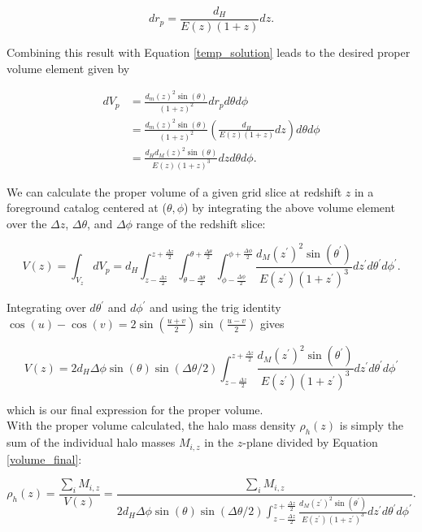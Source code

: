 \documentclass[12pt]{article}
\begin{document}
\begin{equation}\label{physical2comoving_inf}
dr_p=\frac{d_H}{E(z)(1+z)}dz.
\end{equation}

Combining this result with Equation \eqref{temp_solution} leads to the desired proper volume element given by

\begin{align}
dV_p&=\frac{d_m(z)^2\sin(\theta)}{(1+z)^2}dr_pd\theta d\phi\nonumber\\
&=\frac{d_m(z)^2\sin(\theta)}{(1+z)^2}\left(\frac{d_H}{E(z)(1+z)}dz\right)d\theta d\phi\nonumber\\
&=\frac{d_Hd_M(z)^2\sin(\theta)}{E(z)(1+z)^3}dzd\theta d\phi.
\end{align}

We can calculate the proper volume of a given grid slice at redshift $z$ in a foreground catalog centered at ($\theta,\phi$) by integrating the above volume element over the $\Delta z$, $\Delta\theta$, and $\Delta\phi$ range of the redshift slice:

\begin{equation}
V(z)=\int_{V_z}dV_p=d_H\int_{z-\frac{\Delta z}{2}}^{z+\frac{\Delta z}{2}}\int_{\theta-\frac{\Delta\theta}{2}}^{\theta+\frac{\Delta\theta}{2}}\int_{\phi-\frac{\Delta\phi}{2}}^{\phi+\frac{\Delta\phi}{2}} \frac{d_M(z^\prime)^2\sin(\theta^\prime)}{E(z^\prime)(1+z^\prime)^3}dz^\prime d\theta^\prime d\phi^\prime.
\end{equation}

Integrating over $d\theta^\prime$ and $d\phi^\prime$ and using the trig identity ${\cos(u)-\cos(v)=2\sin\left(\frac{u+v}{2}\right)\sin\left(\frac{u-v}{2}\right)}$ gives

\begin{equation}\label{volume_final}
V(z)=2d_H\Delta\phi\sin(\theta)\sin(\Delta\theta/2)\int_{z-\frac{\Delta z}{2}}^{z+\frac{\Delta z}{2}} \frac{d_M(z^\prime)^2\sin(\theta^\prime)}{E(z^\prime)(1+z^\prime)^3}dz^\prime d\theta^\prime d\phi^\prime
\end{equation}

which is our final expression for the proper volume.\\

With the proper volume calculated, the halo mass density $\rho_h(z)$ is simply the sum of the individual halo masses $M_{i,z}$ in the $z$-plane divided by Equation \eqref{volume_final}:

\begin{equation}\label{rho_h}
\rho_h(z)=\frac{\sum_i M_{i,z}}{V(z)}=\frac{\sum_i M_{i,z}}{2d_H\Delta\phi\sin(\theta)\sin(\Delta\theta/2)\int_{z-\frac{\Delta z}{2}}^{z+\frac{\Delta z}{2}} \frac{d_M(z^\prime)^2\sin(\theta^\prime)}{E(z^\prime)(1+z^\prime)^3}dz^\prime d\theta^\prime d\phi^\prime}.
\end{equation}
\end{document}
